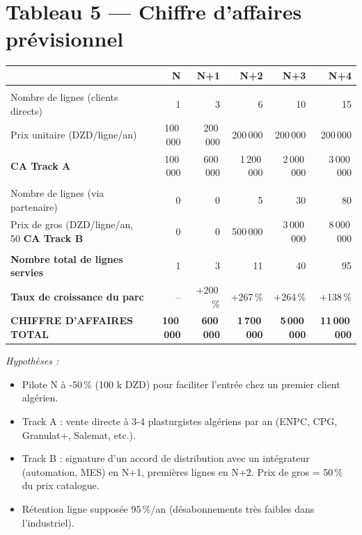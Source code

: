 \documentclass[11pt,a4paper]{article}
\begin{document}
\section{Tableau 5 — Chiffre d'affaires prévisionnel}

\begin{center}
\small
\begin{longtable}{l r r r r r}
\toprule
 & \textbf{N} & \textbf{N+1} & \textbf{N+2} & \textbf{N+3} & \textbf{N+4} \\
\midrule
\endhead

\rowcolor{tablesub}\multicolumn{6}{l}{\textbf{Track A — Vente directe Algérie}} \\
Nombre de lignes (clients directs) & 1 & 3 & 6 & 10 & 15 \\
Prix unitaire (DZD/ligne/an)        & 100\,000 & 200\,000 & 200\,000 & 200\,000 & 200\,000 \\
\rowcolor{tablesub}\textbf{CA Track A}  & 100\,000 & 600\,000 & 1\,200\,000 & 2\,000\,000 & 3\,000\,000 \\

\midrule
\rowcolor{tablesub}\multicolumn{6}{l}{\textbf{Track B — Revendeur / distribution}} \\
Nombre de lignes (via partenaire)  & 0 & 0 & 5 & 30 & 80 \\
Prix de gros (DZD/ligne/an, 50 %
\rowcolor{tablesub}\textbf{CA Track B}  & 0 & 0 & 500\,000 & 3\,000\,000 & 8\,000\,000 \\

\midrule
\rowcolor{tablesub}\multicolumn{6}{l}{\textbf{Total}} \\
\rowcolor{tablesub}\textbf{Nombre total de lignes servies} & 1 & 3 & 11 & 40 & 95 \\
\rowcolor{tablesub}\textbf{Taux de croissance du parc}      & --  & +200\,\% & +267\,\% & +264\,\% & +138\,\% \\

\midrule
\rowcolor{tabletot}\color{white}\bfseries
\textbf{CHIFFRE D'AFFAIRES TOTAL}  & \textbf{100\,000} & \textbf{600\,000} & \textbf{1\,700\,000} & \textbf{5\,000\,000} & \textbf{11\,000\,000} \\
\bottomrule
\end{longtable}
\end{center}

\noindent\textit{Hypothèses :}
\begin{itemize}\itemsep0pt
  \item Pilote N à -50\,\% (100 k DZD) pour faciliter l'entrée chez un premier client algérien.
  \item Track A : vente directe à 3-4 plasturgistes algériens par an (ENPC, CPG, Granulat+, Salemat, etc.).
  \item Track B : signature d'un accord de distribution avec un intégrateur (automation, MES) en N+1, premières lignes en N+2. Prix de gros = 50\,\% du prix catalogue.
  \item Rétention ligne supposée 95\,\%/an (désabonnements très faibles dans l'industriel).
\end{itemize}
\end{document}
